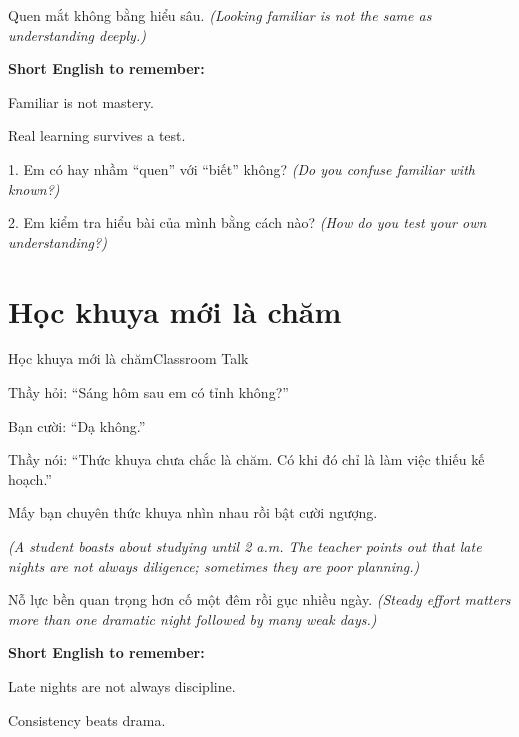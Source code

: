 \begin{baihoc}
Quen mắt không bằng hiểu sâu.
\textit{(Looking familiar is not the same as understanding deeply.)}
\end{baihoc}

\begin{ghinhoanh}
\textbf{Short English to remember:}

Familiar is not mastery.

Real learning survives a test.
\end{ghinhoanh}

\begin{tuhocnhanh}
1. Em có hay nhầm ``quen'' với ``biết'' không? \textit{(Do you confuse familiar with known?)}

2. Em kiểm tra hiểu bài của mình bằng cách nào? \textit{(How do you test your own understanding?)}
\end{tuhocnhanh}
\ngancach

\section{Học khuya mới là chăm}
\begin{truyen}{Học khuya mới là chăm}{Classroom Talk}

Thầy hỏi: ``Sáng hôm sau em có tỉnh không?''

Bạn cười: ``Dạ không.''

Thầy nói: ``Thức khuya chưa chắc là chăm. Có khi đó chỉ là làm việc thiếu kế hoạch.''

Mấy bạn chuyên thức khuya nhìn nhau rồi bật cười ngượng.

\textit{(A student boasts about studying until 2 a.m. The teacher points out that late nights are not always diligence; sometimes they are poor planning.)}
\end{truyen}

\begin{baihoc}
Nỗ lực bền quan trọng hơn cố một đêm rồi gục nhiều ngày.
\textit{(Steady effort matters more than one dramatic night followed by many weak days.)}
\end{baihoc}

\begin{ghinhoanh}
\textbf{Short English to remember:}

Late nights are not always discipline.

Consistency beats drama.
\end{ghinhoanh}

